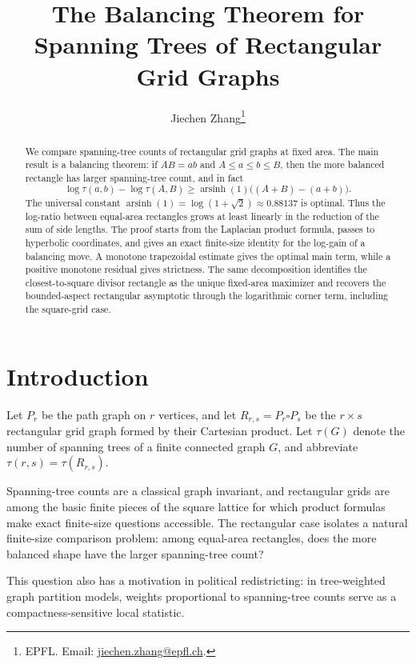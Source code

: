 \documentclass[11pt]{article}
\title{\bfseries The Balancing Theorem for Spanning Trees of Rectangular Grid Graphs}
\author{Jiechen Zhang\footnote{EPFL\@. Email: \href{mailto:jiechen.zhang@epfl.ch}{jiechen.zhang@epfl.ch}.}}
\date{}
\numberwithin{equation}{section}
\begin{document}
\maketitle

\begin{abstract}
We compare spanning-tree counts of rectangular grid graphs at fixed area. The main result is a balancing theorem: if $AB=ab$ and $A\le a\le b\le B$, then the more balanced rectangle has larger spanning-tree count, and in fact
\[
  \log\tau(a,b)-\log\tau(A,B)
  \ge
  \operatorname{arsinh}(1)\bigl((A+B)-(a+b)\bigr).
\]
The universal constant $\operatorname{arsinh}(1)=\log(1+\sqrt{2})\approx0.88137$ is optimal. Thus the log-ratio between equal-area rectangles grows at least linearly in the reduction of the sum of side lengths. The proof starts from the Laplacian product formula, passes to hyperbolic coordinates, and gives an exact finite-size identity for the log-gain of a balancing move. A monotone trapezoidal estimate gives the optimal main term, while a positive monotone residual gives strictness. The same decomposition identifies the closest-to-square divisor rectangle as the unique fixed-area maximizer and recovers the bounded-aspect rectangular asymptotic through the logarithmic corner term, including the square-grid case.
\end{abstract}

\clearpage

\section{Introduction}

Let $P_r$ be the path graph on $r$ vertices, and let $R_{r,s}=P_r\square P_s$ be the $r\times s$ rectangular grid graph formed by their Cartesian product. Let $\tau(G)$ denote the number of spanning trees of a finite connected graph $G$, and abbreviate $\tau(r,s)=\tau(R_{r,s})$.

Spanning-tree counts are a classical graph invariant, and rectangular grids are among the basic finite pieces of the square lattice for which product formulas make exact finite-size questions accessible. The rectangular case isolates a natural finite-size comparison problem: among equal-area rectangles, does the more balanced shape have the larger spanning-tree count?

This question also has a motivation in political redistricting: in tree-weighted graph partition models, weights proportional to spanning-tree counts serve as a compactness-sensitive local statistic.
\end{document}
